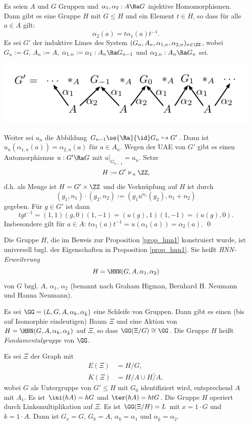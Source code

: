 \PROP\label{prop_hnn1}
Es seien $A$ und $G$ Gruppen und $\alpha_1,\alpha_2:A\Ra G$
injektive Homomorphismen.
Dann gibt es eine Gruppe $H$ mit $G\leq H$ und ein Element $t\in H$,
so dass für alle $a\in A$ gilt:
\[
\alpha_2(a) = t \alpha_1(a) t^{-1}.
\]
\bew Es sei $G'$ der induktive Limes des System
$(G_n, A_n, \alpha_{1,n}, \alpha_{2,n})_{n\in \ZZ}$,
wobei $G_n:=G$, $A_n:=A$, $\alpha_{1,n}:=\alpha_1:A_n\Ra G_{n-1}$
und $\alpha_{2,n}:A_n\Ra G_n$ sei.
\begin{center}
	\includegraphics{grugraImages/Glimes}
\end{center}
Weiter sei $u_n$ die Abbildung
$G_{n-1}\os{\Ra}{\id} G_n \hookrightarrow G'$. Dann ist
$u_n(\alpha_{1,n}(a))=\alpha_{2,n}(a)$ für $a\in A_n$.
Wegen der UAE von $G'$ gibt es einen Automorphismus
$u:G'\Ra G$ mit $u|_{G_{n-1}}=u_n$.
Setze
\[
H := G' \ltimes_u \ZZ,
\]
d.h. als Menge ist $H=G'\times \ZZ$ und die Verknüpfung auf $H$
ist durch
\[
(g_1, n_1) \cdot (g_2, n_2) := (g_1 u^{n_1}(g_2), n_1+n_2)
\]
gegeben.
Für $g\in G'$ ist dann
\[
t g t^{-1} = (1,1)(g,0)(1,-1)
= (u(g),1)(1,-1) = (u(g),0).
\]
Insbesondere gilt für $a\in A$:
$t \alpha_1(a) t^{-1} = u(\alpha_1(a)) = \alpha_2(a)$.
\qed

\DB Die Gruppe $H$, die im Beweis zur Proposition \ref{prop_hnn1}
konstruiert wurde, ist universell bzgl. der Eigenschaften
in Proposition \ref{prop_hnn1}.
Sie heißt \emph{HNN-Erweiterung}
\[
H = \HNN(G,A,\alpha_1,\alpha_2)
\]
von $G$ bzgl. $A$, $\alpha_1$, $\alpha_2$
(benannt nach Graham Higman, Bernhard H. Neumann und Hanna Neumann).

\PROP \label{prop_hnn2}
Es sei $\GG=(L,G,A,\alpha_k,\alpha_{\bar{k}})$ eine Schleife von
Gruppen. Dann gibt es einen (bis auf Isomorphie eindeutigen)
Baum $\Xi$ und eine Aktion von $H=\HNN(G,A,\alpha_k,\alpha_{\bar{k}})$
auf $\Xi$, so dass $\GG(\Xi/G)\cong \GG$.
Die Gruppe $H$ heißt \emph{Fundamentalgruppe}
von $\GG$.

\bew Es sei $\Xi$ der Graph mit
\begin{align*}
E(\Xi) &= H/G, \\
K(\Xi) &= H/A \cup \bar{H/A},
\end{align*}
wobei $G$ als Untergruppe von $G'\leq H$ mit $G_0$ identifiziert wird,
entsprechend $A$ mit $A_1$.
Es ist $\ini(hA)=hG$ und $\ter(hA)=htG$.
Die Gruppe $H$ operiert durch Linksmultiplikation auf $\Xi$.
Es ist $\GG(\Xi/H)=L$ mit $x=1\cdot G$ und $k=1\cdot A$.
Dann ist $G_x=G$, $G_k=A$, $\alpha_k=\alpha_1$ und
$\alpha_{\bar{k}}=\alpha_2$.

